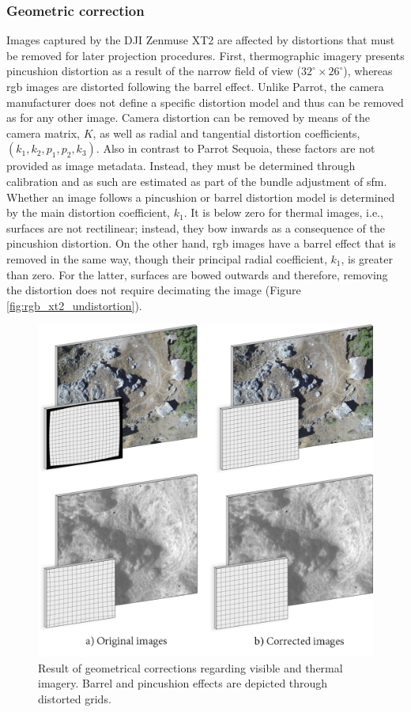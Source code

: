 \subsubsection{Geometric correction}

Images captured by the DJI Zenmuse XT2 are affected by distortions that must be removed for later projection procedures. First, thermographic imagery presents pincushion distortion as a result of the narrow field of view ($32^\circ \times 26^\circ$), whereas \acrshort{rgb} images are distorted following the barrel effect. Unlike Parrot, the camera manufacturer does not define a specific distortion model and thus can be removed as for any other image. Camera distortion can be removed by means of the camera matrix, $K$, as well as radial and tangential distortion coefficients, $(k_1, k_2, p_1, p_2, k_3)$. Also in contrast to Parrot Sequoia, these factors are not provided as image metadata. Instead, they must be determined through calibration and as such are estimated as part of the bundle adjustment of \acrshort{sfm}. Whether an image follows a pincushion or barrel distortion model is determined by the main distortion coefficient, $k_1$. It is below zero for thermal images, i.e., surfaces are not rectilinear; instead, they bow inwards as a consequence of the pincushion distortion. On the other hand, \acrshort{rgb} images have a barrel effect that is removed in the same way, though their principal radial coefficient, $k_1$, is greater than zero. For the latter, surfaces are bowed outwards and therefore, removing the distortion does not require decimating the image (Figure \ref{fig:rgb_xt2_undistortion}).

\begin{figure}
    \includegraphics{figs/materials/thermal_distortion.png}
    \caption{Result of geometrical corrections regarding visible and thermal imagery. Barrel and pincushion effects are depicted through distorted grids.}
    \label{fig:thermal_rgb_distortion}
\end{figure}

